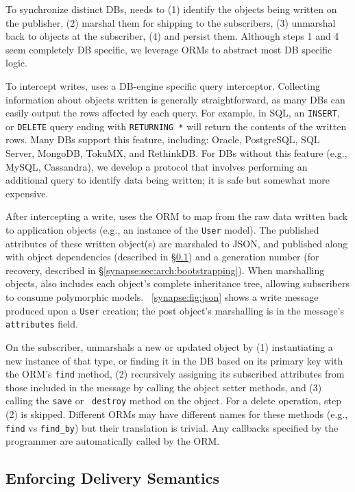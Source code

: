 To synchronize distinct DBs, \synapse needs to (1) identify the objects being
written on the publisher, (2) marshal them for shipping to the subscribers, (3)
unmarshal back to objects at the subscriber, (4) and persist them.
Although steps 1 and 4 seem completely DB specific, we leverage ORMs to abstract most DB specific logic.

To intercept writes, \synapse uses a DB-engine specific query interceptor.
Collecting information about objects written is
generally straightforward, as many DBs can easily output the rows affected
by each query. For example, in SQL, an {\tt INSERT}, or {\tt DELETE}
query ending with {\tt RETURNING *} will return the contents of the
written rows. Many DBs support this feature, including: Oracle, PostgreSQL, SQL
Server, MongoDB, TokuMX, and RethinkDB. For DBs without this feature
(e.g., MySQL, Cassandra), we develop a protocol that involves performing an additional
query to identify data being written; it is safe but somewhat more expensive.


After intercepting a write, \synapse uses the ORM to map from the raw data
written back to application objects (e.g., an instance of the {\tt User} model).
The published attributes of these written object(s) are marshaled to JSON, and published
along with object dependencies (described in
\S\ref{synapse:sec:arch:cross-db-causality}) and a generation number (for recovery,
described in \S\ref{synapse:sec:arch:bootstrapping}). When marshalling objects,
\synapse also includes each object's complete inheritance tree, allowing
subscribers to consume polymorphic models.
\F~\ref{synapse:fig:json} shows a write message produced
upon a {\tt User} creation; the post object's marshalling is in the message's
{\tt attributes} field.

On the subscriber, \synapse unmarshals a new or updated object by (1)
instantiating a new instance of that type, or finding it in the DB based on its primary key with
the ORM's {\tt find} method, (2) recursively assigning its
subscribed attributes from those included in the message by calling the
object setter methods, and (3) calling the {\tt save} or {\tt
destroy} method on the object. For a delete operation, step (2) is skipped.
Different ORMs may have different names for these methods (e.g., {\tt find} vs
{\tt find\_by}) but their translation is trivial. Any callbacks specified by the
programmer are automatically called by the ORM.

\subsection{Enforcing Delivery Semantics} \label{synapse:sec:arch:cross-db-causality}

